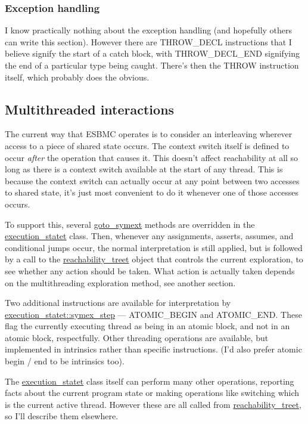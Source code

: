 \documentclass{article}
\begin{document}
\subsubsection{Exception handling}

I know practically nothing about the exception handling (and hopefully others
can write this section). However there are THROW\_DECL instructions that I
believe signify the start of a catch block, with THROW\_DECL\_END signifying
the end of a particular type being caught. There's then the THROW instruction
itself, which probably does the obvious.

\subsection{Multithreaded interactions}

The current way that ESBMC operates is to consider an interleaving wherever
access to a piece of shared state occurs. The context switch itself is defined
to occur \textit{after} the operation that causes it. This doesn't affect
reachability at all so long as there is a context switch available at the start
of any thread. This is because the context switch can actually occur at any
point between two accesses to shared state, it's just most convenient to do
it whenever one of those accesses occurs.

To support this, several \url{goto_symext} methods are overridden in the
\url{execution_statet} class. Then, whenever any assignments, asserts,
assumes, and conditional jumps occur, the normal interpretation is still
applied, but is followed by a call to the \url{reachability_treet} object
that controls the current exploration, to see whether any action should be
taken. What action is actually taken depends on the multithreading exploration
method, see another section.

Two additional instructions are available for interpretation by
\url{execution_statet::symex_step} --- ATOMIC\_BEGIN and ATOMIC\_END.
These flag the currently executing thread as being in an atomic block,
and not in an atomic block, respectfully. Other threading operations are
available, but implemented in intrinsics rather than specific instructions.
(I'd also prefer atomic begin / end to be intrinsics too).

The \url{execution_statet} class itself can perform many other operations,
reporting facts about the current program state or making operations like
switching which is the current active thread. However these are all called
from \url{reachability_treet}, so I'll describe them elsewhere.
\end{document}
